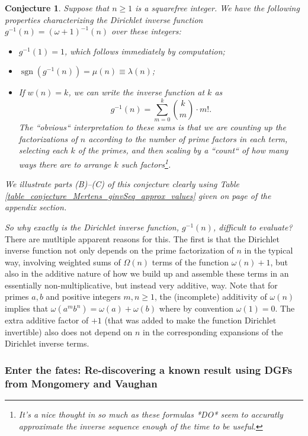 \documentclass[11pt,reqno,a4letter]{article}
\numberwithin{figure}{section}
\numberwithin{table}{section}
\theoremstyle{plain}
\newtheorem{conjecture}[theorem]{Conjecture}
\numberwithin{theorem}{section}
\theoremstyle{definition}
\begin{document}
\begin{conjecture}
\label{lemma_gInv_MxExample} 
Suppose that $n \geq 1$ is a squarefree integer. We have the following properties characterizing the 
Dirichlet inverse function $g^{-1}(n) = (\omega+1)^{-1}(n)$ over these integers: 
\begin{itemize} 

\item[(A)] $g^{-1}(1) = 1$, which follows immediately by computation; 
\item[(B)] $\operatorname{sgn}(g^{-1}(n)) = \mu(n) \equiv \lambda(n)$; 
\item[(C)] If $w(n) = k$, we can write the inverse function at $k$ as 
     \[
     g^{-1}(n) = \sum_{m=0}^{k} \binom{k}{m} \cdot m!. 
     \]
     The ``obvious`` interpretation to these sums is that we are counting up the factorizations of 
     $n$ according to the number of prime factors in each term, selecting each $k$ of the primes, and then 
     scaling by a ``count`` of how many ways there are to arrange $k$ such factors\footnote{
          \emph{It's a nice thought in so much as these formulas *DO* seem to accuratly approximate the 
          inverse sequence enough of the time to be useful.}
           }.
\end{itemize} 
We illustrate parts (B)--(C) of this conjecture clearly using 
Table \ref{table_conjecture_Mertens_ginvSeq_approx_values} given on 
page \pageref{table_conjecture_Mertens_ginvSeq_approx_values} of the appendix section. 
\end{conjecture} 

\textit{So why exactly is the Dirichlet inverse function, $g^{-1}(n)$, difficult to evaluate? } 
There are mutltiple apparent reasons for this. The first is that the Dirichlet inverse function not only 
depends on the prime factorization of $n$ in the typical way, involving weighted sums of $\Omega(n)$ terms of the 
function $\omega(n) + 1$, but also in the additive nature of how we build up and assemble these terms in an essentially 
non-multiplicative, but instead very additive, way.  
Note that for primes $a,b$ and positive integers $m,n \geq 1$, the 
(incomplete) additivity of $\omega(n)$ implies that $\omega(a^m b^n) = \omega(a) + \omega(b)$ where by convention 
$\omega(1) = 0$. The extra additive factor of $+1$ (that was added to make the function Dirichlet invertible) 
also does not depend on $n$ in the corresponding expansions of the Dirichlet inverse terms. 

\subsubsection{Enter the fates: Re-discovering a known result using DGFs from Mongomery and Vaughan} 
\end{document}
